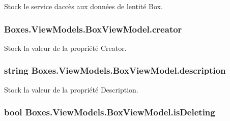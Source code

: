 Stock le service d\textquotesingle{}accès aux données de l\textquotesingle{}entité Box. 

\subsubsection[{\texorpdfstring{creator}{creator}}]{ Boxes.\+View\+Models.\+Box\+View\+Model.\+creator\hspace{0.3cm}{\ttfamily [private]}}\hypertarget{class_boxes_1_1_view_models_1_1_box_view_model_a381eb3cf2b289876f9563b38ed542ba7}{}\label{class_boxes_1_1_view_models_1_1_box_view_model_a381eb3cf2b289876f9563b38ed542ba7}


Stock la valeur de la propriété {\ttfamily Creator}. 

\subsubsection[{\texorpdfstring{description}{description}}]{\setlength{\rightskip}{0pt plus 5cm}string Boxes.\+View\+Models.\+Box\+View\+Model.\+description\hspace{0.3cm}{\ttfamily [private]}}\hypertarget{class_boxes_1_1_view_models_1_1_box_view_model_a822fd258489309723c493ce381df9a2e}{}\label{class_boxes_1_1_view_models_1_1_box_view_model_a822fd258489309723c493ce381df9a2e}


Stock la valeur de la propriété {\ttfamily Description}. 

\subsubsection[{\texorpdfstring{is\+Deleting}{isDeleting}}]{\setlength{\rightskip}{0pt plus 5cm}bool Boxes.\+View\+Models.\+Box\+View\+Model.\+is\+Deleting\hspace{0.3cm}{\ttfamily [private]}}\hypertarget{class_boxes_1_1_view_models_1_1_box_view_model_a6630347a51df0e27d17781b5ac1606ba}{}\label{class_boxes_1_1_view_models_1_1_box_view_model_a6630347a51df0e27d17781b5ac1606ba}


